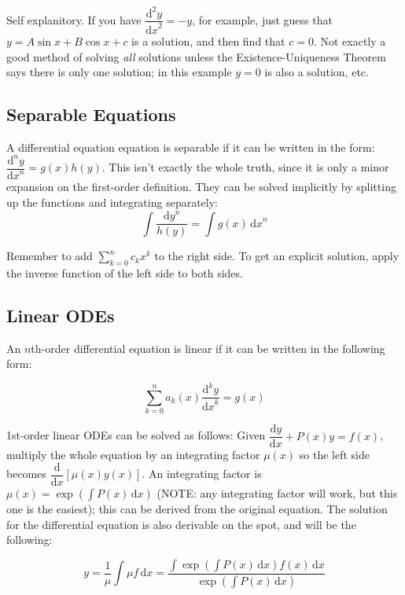 \documentclass[12pt]{article}
\newcommand \dstyle \displaystyle
\renewcommand \d [1] {\mathrm{d}{#1}}
\newcommand \dx {{\d x}}
\newcommand \dy {{\d y}}
\newcommand \dydx {\dfrac \dy\dx}
\newcommand \ndydx [1] {\dfrac{\mathrm{d}^{#1} y}{\dx^{#1}}}
\begin{document}
Self explanitory. If you have $\ndydx 2 = -y$, for example, just guess that $y = A \sin x + B \cos x + c$ is a solution, and then find that $c=0$. Not exactly a good method of solving \emph{all} solutions unless the Existence-Uniqueness Theorem says there is only one solution; in this example $y = 0$ is also a solution, etc.

\subsection{Separable Equations}

A differential equation equation is separable if it can be written in the form: $\dstyle \ndydx n = g(x) h(y)$. This isn't exactly the whole truth, since it is only a minor expansion on the first-order definition. They can be solved implicitly by splitting up the functions and integrating separately:
\begin{equation}
	\int\!\dfrac {\dy^n}{h(y)} = \int \! g(x) \, \dx^n
\end{equation}

Remember to add $\dstyle \sum_{k=0}^n c_k x^k$ to the right side. To get an explicit solution, apply the inverse function of the left side to both sides.

\subsection{Linear ODEs}

An $n$th-order differential equation is linear if it can be written in the following form:

\begin{equation*}
	\sum_{k=0}^n a_k(x) \ndydx k = g(x)
\end{equation*}

1st-order linear ODEs can be solved as follows: Given $\dydx + P(x) y = f(x)$, multiply the whole equation by an integrating factor $\mu(x)$ so the left side becomes $\dstyle \dfrac{\mathrm d}\dx \left[\mu(x) y(x)\right]$. An integrating factor is $\dstyle \mu(x) = \exp\!\left(\int \! P(x) \, \dx\right)$ (NOTE: any integrating factor will work, but this one is the easiest); this can be derived from the original equation. The solution for the differential equation is also derivable on the spot, and will be the following:

\begin{equation}
	\dstyle y = \dfrac 1 \mu \int \! \mu f \, \dx = \dfrac{\int \exp\!\left(\int \! P(x) \, \dx\right) \! f(x) \, \dx}{\exp\!\left(\int \! P(x) \, \dx\right)}
\end{equation}
\end{document}
